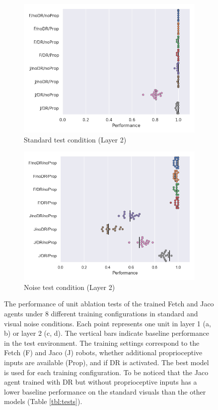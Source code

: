 \begin{figure}[h!]
  \begin{subfigure}{0.49\linewidth}
    \includegraphics[width=\textwidth]{figures/chapter6/unitablation/conv2_ablations}
    \caption{Standard test condition (Layer 2)}
  \end{subfigure}
  \begin{subfigure}{0.49\linewidth}
    \includegraphics[width=\textwidth]{figures/chapter6/unitablation/conv2_ablations_noisy}
    \caption{Noise test condition (Layer 2)}
  \end{subfigure}
  \caption{The performance of unit ablation tests of the trained Fetch and Jaco agents under 8 different training configurations in standard and visual noise conditions. Each point represents one unit in layer 1 (a, b) or layer 2 (c, d). The vertical bars indicate baseline performance in the test environment. The training settings correspond to the Fetch (F) and Jaco (J) robots, whether additional proprioceptive inputs are available (Prop), and if DR is activated. The best model is used for each training configuration. To be noticed that the Jaco agent trained with DR but without proprioceptive inputs has a lower baseline performance on the standard visuals than the other models (Table \ref{tbl:tests}).}
  \label{fig:unit_ablations}
\end{figure}
